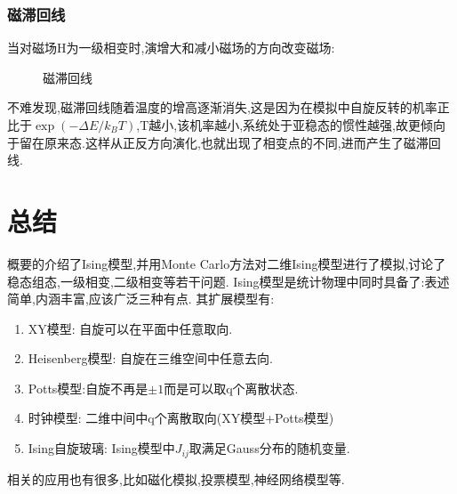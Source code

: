 \documentclass[12pt]{article} %
\begin{document}
\subsubsection{磁滞回线}
当对磁场H为一级相变时,演增大和减小磁场的方向改变磁场:
\begin{figure}[hbt]
    \caption{磁滞回线}
    \begin{center}
    \end{center}
\end{figure}
不难发现,磁滞回线随着温度的增高逐渐消失,这是因为在模拟中自旋反转的机率正比于$\exp(-\Delta E/k_{B}T)$,T越小,该机率越小,系统处于亚稳态的惯性越强,故更倾向于留在原来态.这样从正反方向演化,也就出现了相变点的不同,进而产生了磁滞回线.

\section{总结}
概要的介绍了Ising模型,并用Monte Carlo方法对二维Ising模型进行了模拟,讨论了稳态组态,一级相变,二级相变等若干问题.
Ising模型是统计物理中同时具备了:表述简单,内涵丰富,应该广泛三种有点.
其扩展模型有:
\begin{enumerate}
    \item XY模型: 自旋可以在平面中任意取向.
    \item Heisenberg模型: 自旋在三维空间中任意去向.
    \item Potts模型:自旋不再是$\pm1$而是可以取q个离散状态.
    \item 时钟模型: 二维中间中q个离散取向(XY模型+Potts模型)
    \item Ising自旋玻璃: Ising模型中$J_{ij}$取满足Gauss分布的随机变量.
\end{enumerate}
相关的应用也有很多,比如磁化模拟,投票模型,神经网络模型等.
\end{document}
